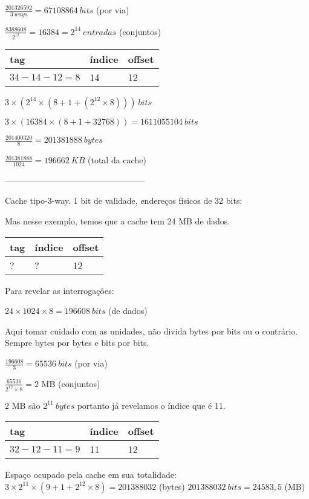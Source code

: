 \documentclass[11pt,twocolumn]{article}
\begin{document}
$\frac{201326592}{3\ ways} = 67108864\ bits$ (por via)

$\frac{8388608}{2^{12}} = 16384 = 2^{14}\ entradas$ (conjuntos)

\begin{tabular}{|l|l|l|}
\hline tag & índice & offset \\ 
\hline $34-14-12=8$ & 14 & 12 \\ 
\hline 
\end{tabular}


$3\times(2^{14}\times(8+1+(2^{12}\times8)))\ bits$

$3\times(16384\times(8+1+32768)) = 1611055104\ bits$

$\frac{201400320}{8} = 201381888\ bytes$

$\frac{201381888}{1024} = 196662\ KB$ (total da cache)

--------------------------------------------------

\clearpage

Cache tipo-3-way. 1 bit de validade, endereços físicos de 32 bits:

Mas nesse exemplo, temos que a cache tem 24 MB de dados.

\begin{tabular}{|l|l|l|}
\hline tag & índice & offset \\ 
\hline ? & ? & 12 \\ 
\hline 
\end{tabular}

Para revelar as interrogações:

$24 \times 1024 \times 8 = 196608\ bits$ (de dados)

Aqui tomar cuidado com as unidades, não
divida bytes por bits ou o contrário.
Sempre bytes por bytes e bits por bits.

$\frac{196608}{3} = 65536\ bits$ (por via)

$\frac{65536}{2^{12} \times 8} = 2$ MB (conjuntos)

$2$ MB são $2^{11}\ bytes$ portanto já revelamos o índice que é 11.

\begin{tabular}{|l|l|l|}
\hline tag & índice & offset \\ 
\hline $32-12-11=9$ & 11 & 12 \\ 
\hline 
\end{tabular}

Espaço ocupado pela cache em sua totalidade: 
$3 \times 2^{11} \times (9 + 1 + 2^{12} \times 8) = 201388032$ (bytes)
$201388032\ bits = 24583,5$ (MB)
\end{document}
